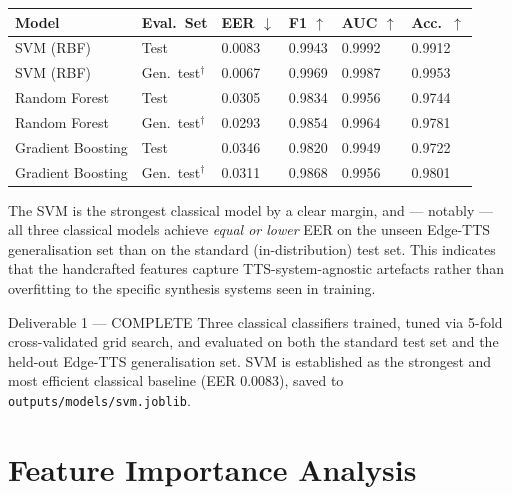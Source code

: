 \documentclass[12pt,a4paper]{report}
\begin{document}
\begin{center}
\begin{tabular}{L{3cm}L{2.6cm}C{1.5cm}C{1.3cm}C{1.3cm}C{1.4cm}}
  \toprule
  \color{white}\textbf{Model} &
  \color{white}\textbf{Eval.\ Set} &
  \color{white}\textbf{EER $\downarrow$} &
  \color{white}\textbf{F1 $\uparrow$} &
  \color{white}\textbf{AUC $\uparrow$} &
  \color{white}\textbf{Acc.\ $\uparrow$} \\
  \midrule
  SVM (RBF) & Test & 0.0083 & 0.9943 & 0.9992 & 0.9912 \\
  SVM (RBF) & Gen.\ test$^\dagger$ & 0.0067 & 0.9969 & 0.9987 & 0.9953 \\
  Random Forest & Test & 0.0305 & 0.9834 & 0.9956 & 0.9744 \\
  Random Forest & Gen.\ test$^\dagger$ & 0.0293 & 0.9854 & 0.9964 & 0.9781 \\
  Gradient Boosting & Test & 0.0346 & 0.9820 & 0.9949 & 0.9722 \\
  Gradient Boosting & Gen.\ test$^\dagger$ & 0.0311 & 0.9868 & 0.9956 & 0.9801 \\
  \bottomrule
\end{tabular}
\label{tab:baselines}
\end{center}

\medskip
The SVM is the strongest classical model by a clear margin, and --- notably --- all three
classical models achieve \emph{equal or lower} EER on the unseen Edge-TTS generalisation set
than on the standard (in-distribution) test set. This indicates that the handcrafted
features capture TTS-system-agnostic artefacts rather than overfitting to the specific
synthesis systems seen in training.

\begin{deliverablebox}{Deliverable 1 --- COMPLETE}
  Three classical classifiers trained, tuned via 5-fold cross-validated grid search, and
  evaluated on both the standard test set and the held-out Edge-TTS generalisation set.
  SVM is established as the strongest and most efficient classical baseline
  (EER 0.0083), saved to \texttt{outputs/models/svm.joblib}.
\end{deliverablebox}

\section{Feature Importance Analysis}
\end{document}
